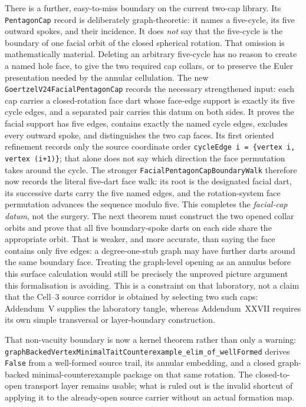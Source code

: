 \documentclass[11pt]{article}
\theoremstyle{definition}
\begin{document}
There is a further, easy-to-miss boundary on the current two-cap library.
Its \texttt{PentagonCap} record is deliberately graph-theoretic: it names a
five-cycle, its five outward spokes, and their incidence.  It does \emph{not}
say that the five-cycle is the boundary of one facial orbit of the closed
spherical rotation.  That omission is mathematically material.  Deleting an
arbitrary five-cycle has no reason to create a named hole face, to give the
two required cap collars, or to preserve the Euler presentation needed by the
annular cellulation.  The new
\texttt{GoertzelV24FacialPentagonCap} records the necessary strengthened
input: each cap carries a closed-rotation face dart whose face-edge support is
exactly its five cycle edges, and a separated pair carries this datum on both
sides.  It proves the facial support has five edges, contains exactly the
named cycle edges, excludes every outward spoke, and distinguishes the two
cap faces.  Its first oriented refinement records only the source coordinate
order \texttt{cycleEdge i = \{vertex i, vertex (i+1)\}}; that alone does not
say which direction the face permutation takes around the cycle.  The stronger
\texttt{FacialPentagonCapBoundaryWalk} therefore now records the literal
five-dart face walk: its root is the designated facial dart, its successive
darts carry the five named edges, and the rotation-system face permutation
advances the sequence modulo five.  This completes the \emph{facial-cap
datum}, not the surgery.  The next theorem must construct the two opened
collar orbits and prove that all
five boundary-spoke darts on each side share the appropriate orbit.  That is
weaker, and more accurate, than saying the face contains only five edges: a
degree-one-stub graph may have further darts around the same boundary face.
Treating the graph-level opening as an annulus before this surface calculation
would still be precisely the unproved picture argument this formalisation is
avoiding.  This is a constraint on that laboratory, not a claim that the
Cell--3 source corridor is obtained by selecting two such caps: Addendum~V
supplies the laboratory tangle, whereas Addendum~XXVII requires its own
simple transversal or layer-boundary construction.

That non-vacuity boundary is now a kernel theorem rather than only a warning:
\texttt{graphBackedVertexMinimalTaitCounterexample\_elim\_of\_wellFormed}
derives \texttt{False} from a well-formed source trail, its annular embedding,
and a closed graph-backed minimal-counterexample package on that same rotation.
The closed-to-open transport layer remains usable; what is ruled out is the
invalid shortcut of applying it to the already-open source carrier without an
actual formation map.
\end{document}
